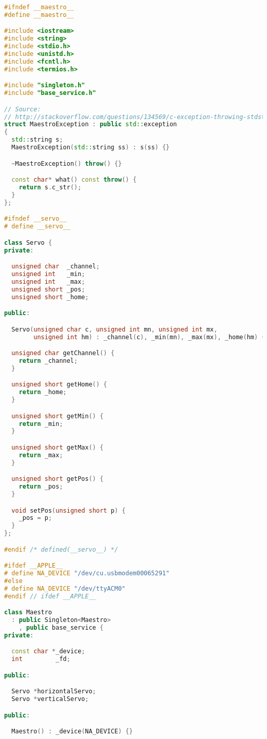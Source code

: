 \begin{lstlisting}[caption=maestro.h,language=C++]
#ifndef __maestro__
#define __maestro__

#include <iostream>
#include <string>
#include <stdio.h>
#include <unistd.h>
#include <fcntl.h>
#include <termios.h>

#include "singleton.h"
#include "base_service.h"

// Source:
// http://stackoverflow.com/questions/134569/c-exception-throwing-stdstring
struct MaestroException : public std::exception
{
  std::string s;
  MaestroException(std::string ss) : s(ss) {}

  ~MaestroException() throw() {}

  const char* what() const throw() {
    return s.c_str();
  }
};

#ifndef __servo__
# define __servo__

class Servo {
private:

  unsigned char  _channel;
  unsigned int   _min;
  unsigned int   _max;
  unsigned short _pos;
  unsigned short _home;

public:

  Servo(unsigned char c, unsigned int mn, unsigned int mx,
        unsigned int hm) : _channel(c), _min(mn), _max(mx), _home(hm) {}

  unsigned char getChannel() {
    return _channel;
  }

  unsigned short getHome() {
    return _home;
  }

  unsigned short getMin() {
    return _min;
  }

  unsigned short getMax() {
    return _max;
  }

  unsigned short getPos() {
    return _pos;
  }

  void setPos(unsigned short p) {
    _pos = p;
  }
};

#endif /* defined(__servo__) */

#ifdef __APPLE__
# define NA_DEVICE "/dev/cu.usbmodem00065291"
#else
# define NA_DEVICE "/dev/ttyACM0"
#endif // ifdef __APPLE__

class Maestro
  : public Singleton<Maestro>
    , public base_service {
private:

  const char *_device;
  int         _fd;

public:

  Servo *horizontalServo;
  Servo *verticalServo;

public:

  Maestro() : _device(NA_DEVICE) {}


\end{lstlisting}
